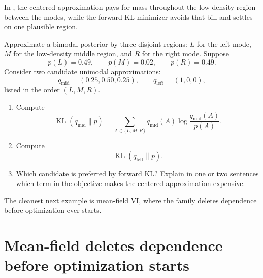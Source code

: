 \documentclass[11pt]{article}
\newif\ifshowsolutions
\newcommand{\SolutionBox}[2][10]{%
  \ifshowsolutions
    \begin{tcolorbox}[stat221panelgray,title={Solution}]
    #2
    \end{tcolorbox}
  \else
    \begin{tcolorbox}[stat221panelgray,unbreakable,title={Workspace}]
    \vspace{#1\baselineskip}
    \end{tcolorbox}
  \fi
}
\begin{document}
In , the centered approximation pays for mass throughout the low-density region between the modes, while the forward-KL minimizer avoids that bill and settles on one plausible region.

\begin{exercise}
\label{ex:forward-kl-undercovers}
Approximate a bimodal posterior by three disjoint regions:
\(L\) for the left mode, \(M\) for the low-density middle region, and \(R\) for the right mode.
Suppose
\[
  p(L)=0.49,
  \qquad
  p(M)=0.02,
  \qquad
  p(R)=0.49.
\]
Consider two candidate unimodal approximations:
\[
  q_{\mathrm{mid}}=(0.25,0.50,0.25),
  \qquad
  q_{\mathrm{left}}=(1,0,0),
\]
listed in the order \((L,M,R)\).
\begin{enumerate}[leftmargin=*]
  \item Compute
  \[
    \operatorname{KL}(q_{\mathrm{mid}}\|p)
    =
    \sum_{A\in\{L,M,R\}}
    q_{\mathrm{mid}}(A)\log\frac{q_{\mathrm{mid}}(A)}{p(A)}.
  \]
  \item Compute
  \[
    \operatorname{KL}(q_{\mathrm{left}}\|p).
  \]
  \item Which candidate is preferred by forward KL?
  Explain in one or two sentences which term in the objective makes the centered approximation expensive.
\end{enumerate}
\end{exercise}
\SolutionBox[12]{For the centered candidate,
\[
  \operatorname{KL}(q_{\mathrm{mid}}\|p)
  =
  0.25\log\frac{0.25}{0.49}
  +
  0.50\log\frac{0.50}{0.02}
  +
  0.25\log\frac{0.25}{0.49}
  =
  \frac12\log\frac{625}{49}.
\]
For the left-mode candidate,
\[
  \operatorname{KL}(q_{\mathrm{left}}\|p)
  =
  1\cdot \log\frac{1}{0.49}
  =
  \log\frac{100}{49}.
\]
Numerically,
\[
  \frac12\log\frac{625}{49}\approx 1.27,
  \qquad
  \log\frac{100}{49}\approx 0.71,
\]
so forward KL prefers \(q_{\mathrm{left}}\).
The key penalty is the middle-region term
\[
  0.50\log\frac{0.50}{0.02},
\]
which is large because the centered approximation places substantial mass where the target density is tiny.
This is the discrete version of undercoverage: missing one mode can be cheaper than paying for mass in a low-density middle region.}

The cleanest next example is mean-field VI, where the family deletes dependence before optimization ever starts.

\section{Mean-field deletes dependence before optimization starts}
\label{sec:mean-field-geometry}
\end{document}
